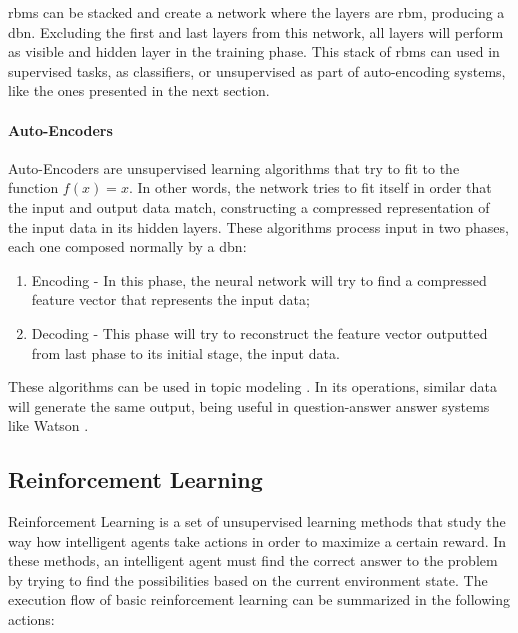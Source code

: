 \documentclass[
  twoside,
  11pt, a4paper,
  footinclude=true,
  headinclude=true,
  cleardoublepage=empty
]{scrbook}
\begin{document}
          \glspl{rbm} can be stacked and create a network where the layers are \gls{rbm}, producing a \gls{dbn}. Excluding the first and last layers from this network, all layers will perform as visible and hidden layer in the training phase. This stack of \glspl{rbm} can used in supervised tasks, as classifiers, or unsupervised as part of auto-encoding systems, like the ones presented in the next section.

        \paragraph{Auto-Encoders}
          Auto-Encoders are unsupervised learning algorithms that try to fit to the function $f(x) = x$. In other words, the network tries to fit itself in order that the input and output data match, constructing a compressed representation of the input data in its hidden layers. These algorithms process input in two phases, each one composed normally by a \gls{dbn}:

          \begin{enumerate}
            \item Encoding - In this phase, the neural network will try to find a compressed feature vector that represents the input data;
            \item Decoding - This phase will try to reconstruct the feature vector outputted from last phase to its initial stage, the input data.
          \end{enumerate}

          These algorithms can be used in topic modeling \cite{mirowski2010dynamic}. In its operations, similar data will generate the same output, being useful in question-answer answer systems like Watson \cite{high2012era}. %

      \subsection{Reinforcement Learning}
        Reinforcement Learning is a set of unsupervised learning methods that study the way how intelligent agents take actions in order to maximize a certain reward. In these methods, an intelligent agent must find the correct answer to the problem by trying to find the possibilities based on the current environment state. The execution flow of basic reinforcement learning can be summarized in the following actions:
\end{document}
